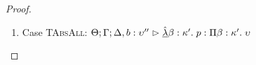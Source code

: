 \begin{proof}
\begin{enumerate}
  First, the syntax:
  \begin{tabbedproof}
    \oo By inversion, $\judgeA[\Theta, \beta:\kappa'; \Gamma; \Delta, b:\upsilon'']{p}{\upsilon}$ \\
    \oo By weakening, $\judgeA[\Theta, \beta:\kappa'; \Gamma; \Delta]{r}{\upsilon''}$ \\
    \oo By induction, $\judgeA[\Theta, \beta:\kappa'; \Gamma; \Delta]{{[r/b]}p}{\upsilon}$ \\
    \oo By rule, $\judgeA[\Theta; \Gamma; \Delta]{\pfun{\beta}{\kappa'}{{[r/b]}p}}{\kappa' \To \upsilon}$ \\
    \oo By def of subst, $\judgeA{{[r/b]}(\pfun{\beta}{\kappa'}{p})}{\kappa' \To \upsilon}$ \\
  \end{tabbedproof}
  For semantics, consider $\interp{\judgeA{[r/b](\pfun{\beta}{\kappa'}{p})}{\kappa' \To \upsilon}}\;\theta\;\gamma\;\delta$ \\
  \begin{eqnproof}
          {Semantics}
          {Induction}
          {Semantics}
  \end{eqnproof}
  This case relies upon the fact that $\Gamma$ and $\Delta$ do not have $\beta$ free and the 
  equality of sorts under substitution. 

\item Case \textsc{TAbsAll}: $\judgeA[\Theta; \Gamma; \Delta, b:\upsilon'']{\pfunall{\beta}{\kappa'}{p}}{\forallsort{\beta}{\kappa'}{\upsilon}}$
  

\end{enumerate}
\end{proof}
